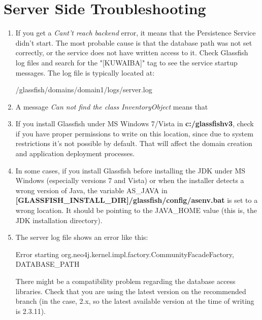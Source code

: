 \documentclass[a4paper]{article}
\begin{document}
			\section{Server Side Troubleshooting} \label{sec:Troubleshooting}
				\begin{enumerate}
					\item If you get a \textit{Cant't reach backend} error, it means that the Persistence Service didn't start. The most probable cause is that the database path was not set correctly, or the service does not have written access to it. Check Glassfish log files and search for the "[KUWAIBA]" tag to see the service startup messages. The log file is typically located at:
					\begin{verbbox}
						/glassfish/domains/domain1/logs/server.log
					\end{verbbox}
					\begin{figure}[h!]
						\centering	
						\theverbbox
					\end{figure}					
					\item A message \textit{Can not find the class InventoryObject} means that 
					\item If you install Glassfish under MS Windows 7/Vista in \textbf{c:/glassfishv3}, check if you have proper permissions to write on this location, since due to system restrictions it's not possible by default. That will affect the domain creation and application deployment processes.
					\item In some cases, if you install Glassfish before installing the JDK under MS Windows (especially versions 7 and Vista) or when the installer detects a wrong version of Java, the variable AS\_JAVA in \textbf{[GLASSFISH\_INSTALL\_DIR]/glassfish/config/asenv.bat} is set to a wrong location. It should be pointing to the JAVA\_HOME value (this is, the JDK installation directory).
					\item The server log file shows an error like this:
					\begin{verbbox}
						Error starting org.neo4j.kernel.impl.factory.CommunityFacadeFactory, DATABASE_PATH
					\end{verbbox}
					\begin{figure}[h!]
						\centering	
						\theverbbox
					\end{figure}
					
					 There might be a compatibility problem regarding the database access libraries. Check that you are using the latest version on the recommended branch (in the case, 2.x, so the latest available version at the time of writing is 2.3.11).
				\end{enumerate}
			\newpage
\end{document}
